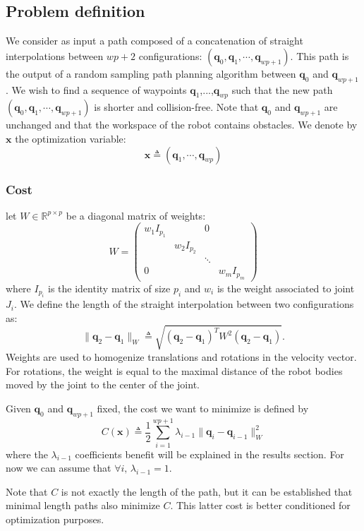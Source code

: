 \documentclass{tADR2e}
\newcommand\real{\mathbb{R}}
\newcommand\conf{\mathbf{q}}
\newcommand\xx{\mathbf{x}}
\newcommand\cost{C}
\begin{document}
\subsection{Problem definition}

We consider as input a path composed of a concatenation of straight 
interpolations between $wp+2$ configurations: $(\conf_0, \conf_1,\cdots,\conf_{wp
+1})$. This path is the output of a random sampling path planning algorithm 
between $\conf_0$ and $\conf_{wp+1}$. We wish to find a sequence of waypoints $
\conf_{1}$,...,$\conf_{wp}$ such that the new path $(\conf_0, \conf_1,\cdots,
\conf_{wp+1})$ is shorter and collision-free. Note that $\conf_0$ and $\conf_{wp
+1}$ are unchanged and that the workspace of the robot contains obstacles. We 
denote by $\xx$ the optimization variable:
$$
\xx \triangleq (\conf_1,\cdots,\conf_{wp})
$$

\subsubsection {Cost}

let $W\in\real^{p\times p}$ be a diagonal matrix of weights:
$$
W=\left(\begin{array}{cccccccccc}
w_1 I_{p_1}       &        &  0  \\
    & w_2 I_{p_2} &        &   \\
    &            & \ddots &   \\
  0 &            &        & w_m I_{p_m}
\end{array}\right)
$$
where $I_{p_i}$ is the identity matrix of size $p_i$ and $w_i$ is the weight 
associated to joint $J_i$. We define the length of the straight interpolation 
between two configurations as:
$$
\|\conf_2 - \conf_1\|_{W} \triangleq \sqrt{(\conf_2 - \conf_1)^T W^2 (\conf_2 - 
\conf_1)}.
$$
Weights are used to homogenize translations and rotations in the velocity vector. 
For rotations, the weight is equal to the maximal distance of the robot bodies 
moved by the joint to the center of the joint.

Given $\conf_0$ and $\conf_{wp+1}$ fixed, the cost we want to minimize is defined 
by
$$
\cost (\xx) \triangleq \frac{1}{2}\sum_{i=1}^{wp+1} \lambda_{i-1} \|\conf_{i}-\conf_{i-1}\|_{W}
^{2}
$$
where the $\lambda_{i-1}$ coefficients benefit will be explained in the results 
section. For now we can assume that $\forall i,\, \lambda_{i-1}=1$.

Note that $\cost$ is not exactly the length of the path, but it can be 
established that minimal length paths also minimize $\cost$. This latter cost is 
better conditioned for optimization purposes.
\end{document}

